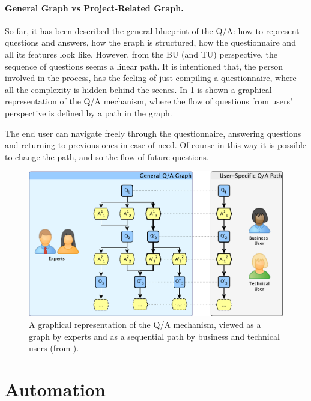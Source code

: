 \documentclass[12pt,a4paper,openright,twoside]{book}
\begin{document}
\paragraph{General Graph vs Project-Related Graph.}
So far, it has been described the general blueprint of the \ac{Q/A}: how to represent questions and answers, how the graph is structured, how the questionnaire and all its features look like.
%
However, from the \acl{BU} (and \acl{TU}) perspective, the sequence of questions seems a linear path.
%
It is intentioned that, the person involved in the process, has the feeling of just compiling a questionnaire, where all the complexity is hidden behind the scenes.
%
In \cref{fig:qa-graph-path} is shown a graphical representation of the \ac{Q/A} mechanism, where the flow of questions from users' perspective is defined by a path in the graph.

The end user can navigate freely through the questionnaire, answering questions and returning to previous ones in case of need.
%
Of course in this way it is possible to change the path, and so the flow of future questions.


\begin{figure}
    \centering
    \includegraphics[width=\linewidth]{figures/qa-graph-path.pdf}
    \caption{
        A graphical representation of the \ac{Q/A} mechanism, viewed as a graph by experts and as a sequential path by business and technical users (from \cite{hicssfairness2025}).
    }
    \label{fig:qa-graph-path}
\end{figure}




\section{Automation}
\end{document}
